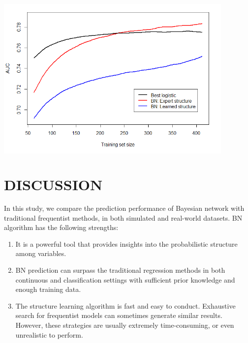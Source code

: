 \documentclass{article}
\begin{document}
\begin{center}
\includegraphics[width=4.59in,height=3.17in]{./media/image9.png}
\end{center}
\vspace{-2.5em}





\section{DISCUSSION}

In this study, we compare the prediction performance of Bayesian network with traditional frequentist methods, in both simulated and real-world datasets. BN algorithm has the following strengths: 
\vspace{-1.5em}
\begin{enumerate}
\setlength\itemsep{0em}
\setlength\itemindent{-1em}
	\item It is a powerful tool that provides insights into the probabilistic structure among variables. 
	\item BN prediction can surpass the traditional regression methods in both continuous and classification settings with sufficient prior knowledge and enough training data. 
	\item The structure learning algorithm is fast and easy to conduct. Exhaustive search for frequentist models can sometimes generate similar results. However, these strategies are usually extremely time-consuming, or even unrealistic to perform. 
\end{enumerate} \par
\end{document}
